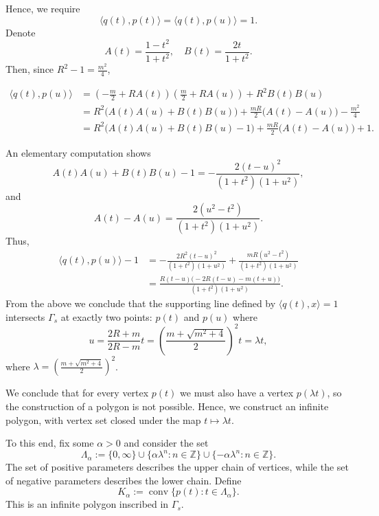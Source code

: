 \documentclass[12pt]{article}
\theoremstyle{remark}
\newcommand{\conv}{\operatorname{conv}}
\begin{document}
Hence, we require \[
\langle q(t), p(t) \rangle = \langle q(t), p(u) \rangle = 1.\]
Denote
\[
A(t) = \frac{1-t^2}{1+t^2}, \quad B(t) = \frac{2t}{1+t^2}.
\]
Then, since $R^2 -1 = \frac{m^2}{4}$,

\begin{align*}
\langle q(t), p(u) \rangle  
&=
\left(-\frac m2+RA(t)\right)
\left(\frac m2+RA(u)\right)
+R^2B(t)B(u)\\
&=
R^2\bigl(A(t)A(u)+B(t)B(u)\bigr)
+\frac{mR}{2}\bigl(A(t)-A(u)\bigr)
-\frac{m^2}{4} \\
&=
R^2\bigl(A(t)A(u)+B(t)B(u) - 1\bigr)
+\frac{mR}{2}\bigl(A(t)-A(u)\bigr)
+ 1.
\end{align*}

An elementary computation shows
\begin{equation}\label{eq:AAB-identity}
        A(t)A(u)+B(t)B(u)-1
        =
        -\frac{2(t-u)^2}{(1+t^2)(1+u^2)},
\end{equation}
and
\begin{equation}\label{eq:A-difference}
        A(t)-A(u)
        =
        \frac{2(u^2-t^2)}{(1+t^2)(1+u^2)}.
\end{equation}
Thus, 
\begin{align*}
\langle q(t), p(u) \rangle -1
&=
-\frac{2R^2(t-u)^2}{(1+t^2)(1+u^2)}
+
\frac{mR(u^2-t^2)}{(1+t^2)(1+u^2)}\\
&=
\frac{R(t-u)\bigl(-2R(t-u)-m(t+u)\bigr)}{(1+t^2)(1+u^2)}.
\end{align*}
From the above we conclude that the supporting line defined by $\langle q(t), x \rangle = 1$ intersects $\Gamma_s$ at exactly two points: $p(t)$ and $p(u)$ where
\[
u= \frac{2R+m}{2R-m}t = \left(\frac{m + \sqrt{m^2 +4}}{2}\right)^2 t = \lambda t,
\]
where $\lambda =  \left(\frac{m + \sqrt{m^2 +4}}{2}\right)^2$.

We conclude that for every vertex $p(t)$ we must also have a vertex $p(\lambda t)$, so the construction of a polygon is not possible. Hence, we construct an infinite polygon, with vertex set closed under the map $t \mapsto \lambda t$.

To this end, fix some $\alpha > 0$ and consider the set 
\begin{equation}\label{eq:Lambda-alpha}
        \Lambda_\alpha
        :=
        \{0,\infty\}
        \cup
        \{\alpha\lambda^n:n\in\mathbb Z\}
        \cup
        \{-\alpha\lambda^n:n\in\mathbb Z\}.
\end{equation}
The set of positive parameters describes the upper chain of vertices, while the set of negative parameters describes the lower chain.  Define
\begin{equation}\label{eq:K-alpha}
        K_\alpha:=\conv\{p(t):t\in\Lambda_\alpha\}.
\end{equation}
This is an infinite polygon inscribed in $\Gamma_s$.
\end{document}
